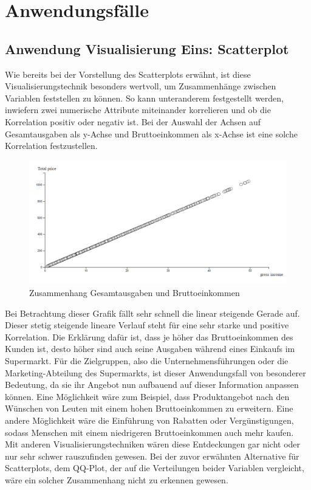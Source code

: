 \documentclass[usegeometry=true]{scrartcl}
\begin{document}
\section{Anwendungsfälle}
\subsection{Anwendung Visualisierung Eins: Scatterplot}
Wie bereits bei der Vorstellung des Scatterplots erwähnt, ist diese Visualisierungstechnik besonders wertvoll, um Zusammenhänge zwischen Variablen feststellen zu können. So kann
unteranderem festgestellt werden, inwiefern zwei numerische Attribute miteinander korrelieren und ob die Korrelation positiv oder negativ ist. Bei der Auswahl der Achsen auf
Gesamtausgaben als y-Achse und Bruttoeinkommen als x-Achse ist eine solche Korrelation festzustellen.
\begin{figure} [H]
	\begin{center}
		\includegraphics[width=15cm]{IMG/TotalPrice_GrossIncome.png}
		\caption{Zusammenhang Gesamtausgaben und Bruttoeinkommen}
		\label{fig:TotalPrice_Income}
	\end{center}
\end{figure}
\noindent Bei Betrachtung dieser Grafik fällt sehr schnell die linear steigende Gerade auf. Dieser stetig steigende lineare Verlauf steht für eine sehr starke und positive
Korrelation. Die Erklärung dafür ist, dass je höher das Bruttoeinkommen des Kunden ist, desto höher sind auch seine Ausgaben während eines Einkaufs im Supermarkt. Für die
Zielgruppen, also die Unternehmensführungen oder die Marketing-Abteilung des Supermarkts, ist dieser Anwendungsfall von besonderer Bedeutung, da sie ihr Angebot nun aufbauend
auf dieser Information anpassen können. Eine Möglichkeit wäre zum Beispiel, dass Produktangebot nach den Wünschen von Leuten mit einem hohen Bruttoeinkommen zu erweitern.
Eine andere Möglichkeit wäre die Einführung von Rabatten oder Vergünstigungen, sodass Menschen mit einem niedrigeren Bruttoeinkommen auch mehr kaufen. \\
\noindent Mit anderen Visualisierungstechniken wären diese Entdeckungen gar nicht oder nur sehr schwer rauszufinden gewesen. Bei der zuvor erwähnten Alternative für Scatterplots,
dem QQ-Plot, der auf die Verteilungen beider Variablen vergleicht, wäre ein solcher Zusammenhang nicht zu erkennen gewesen.
\end{document}

